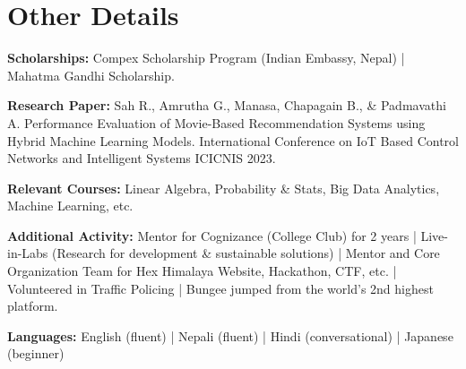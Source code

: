 \documentclass[a4paper,11pt]{article}
\begin{document}
\section{Other Details}
\begin{itemize}[leftmargin=0.15in, label={}]
	\setlength\itemsep{-2pt}
	\small{
		\item{
		      \textbf{Scholarships:}{ Compex Scholarship Program (Indian Embassy, Nepal) | Mahatma Gandhi Scholarship.} \\
		}
		
		\item{
		      \textbf{Research Paper:}{ Sah R., Amrutha G., Manasa, Chapagain B., \& Padmavathi A. Performance Evaluation of Movie-Based Recommendation Systems using Hybrid Machine Learning Models. International Conference on IoT Based Control Networks and Intelligent Systems ICICNIS 2023.
		      	} \\
		}
				
		\item{
		      \textbf{Relevant Courses:}{ Linear Algebra, Probability \& Stats, Big Data Analytics, Machine Learning, etc.} \\
		}
		\item{
		      \textbf{Additional Activity:}{ Mentor for Cognizance (College Club) for 2 years | Live-in-Labs (Research for development \& sustainable solutions) | Mentor and Core Organization Team for Hex Himalaya Website, Hackathon, CTF, etc.} | Volunteered in Traffic Policing |  Bungee jumped from the world's 2nd highest platform. \\
		}
		
		\item{
		      \textbf{Languages:}{ English (fluent) | Nepali (fluent) | Hindi (conversational) | Japanese (beginner)}
		}
		 
	}
\end{itemize}

\end{document}
